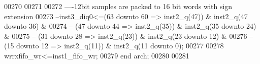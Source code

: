 \begin{DoxyCode}
00270                 
00271                 
00272 \textcolor{keyword}{----12bit samples are packed to 16 bit words with sign extension }
00273 \textcolor{keyword}{--inst3\_diq0<=(63 downto 60 => inst2\_q(47)) & inst2\_q(47 downto 36) & }
00274 \textcolor{keyword}{--              (47 downto 44 => inst2\_q(35)) & inst2\_q(35 downto 24) & }
00275 \textcolor{keyword}{--              (31 downto 28 => inst2\_q(23)) & inst2\_q(23 downto 12) & }
00276 \textcolor{keyword}{--              (15 downto 12 => inst2\_q(11)) & inst2\_q(11 downto 0);               }
00277 
00278 \textcolor{vhdlchar}{wrrxfifo_wr}\textcolor{vhdlchar}{<=}\textcolor{vhdlchar}{inst1_fifo_wr};
00279 \textcolor{keywordflow}{end} \textcolor{vhdlchar}{arch};   
00280 
00281 
\end{DoxyCode}
